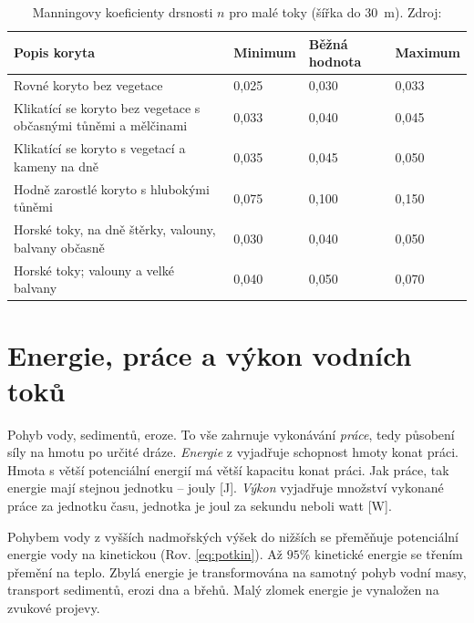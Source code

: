 \begin{table}[]
	\begin{tabularx}{1\textwidth}{@{}Xlll@{}}
		\toprule
		Popis koryta                                                    & Minimum & Běžná hodnota & Maximum \\ \midrule
		Rovné koryto bez vegetace                                       & 0,025   & 0,030         & 0,033   \\
		Klikatící se koryto bez vegetace s občasnými tůněmi a mělčinami & 0,033   & 0,040         & 0,045   \\
		Klikatící se koryto s vegetací a kameny na dně                  & 0,035   & 0,045         & 0,050   \\
		Hodně zarostlé koryto s hlubokými tůněmi                        & 0,075   & 0,100         & 0,150   \\
		Horské toky, na dně štěrky, valouny, balvany občasně            & 0,030   & 0,040         & 0,050   \\
		Horské toky; valouny a velké balvany                            & 0,040   & 0,050         & 0,070  \\ \bottomrule
	\end{tabularx}
	\caption{Manningovy koeficienty drsnosti $n$ pro malé toky (šířka do \SI{30}{\metre}). Zdroj: \textcite{chowOpenchannelHydraulics1959}}
	\label{tab:manning}
\end{table}

\section{Energie, práce a výkon vodních toků}
Pohyb vody, sedimentů, eroze. To vše zahrnuje vykonávání \emph{práce}, tedy působení síly na hmotu po určité dráze. \emph{Energie} z vyjadřuje schopnost hmoty konat práci. Hmota s větší potenciální energií má větší kapacitu konat práci. Jak práce, tak energie mají stejnou jednotku -- jouly [\si{\joule}]. \emph{Výkon} vyjadřuje množství vykonané práce za jednotku času, jednotka je joul za sekundu neboli watt [\si{\watt}].

Pohybem vody z vyšších nadmořských výšek do nižších se přeměňuje potenciální energie vody na kinetickou (Rov. \ref{eq:potkin}). Až $95 \%$ kinetické energie se třením přemění na teplo. Zbylá energie je transformována na samotný pohyb vodní masy, transport sedimentů, erozi dna a břehů. Malý zlomek energie je vynaložen na zvukové projevy. 

